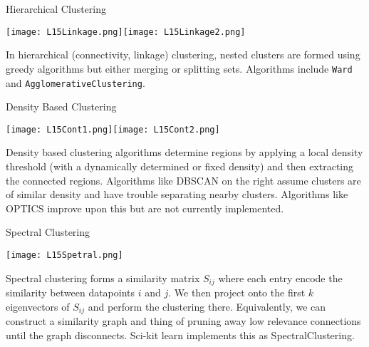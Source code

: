 \documentclass[10pt, table, dvipsnames,xcdraw,handout]{beamer}
\begin{document}
\begin{frame}[fragile]{Hierarchical Clustering}
  \begin{minipage}[t][0.5\textheight][t]{\textwidth}
	\centering \texttt{[image: L15Linkage.png]}\hspace{3em}\texttt{[image: L15Linkage2.png]} 
  \end{minipage}
  \vfill
\begin{minipage}[t][0.4\textheight][t]{\textwidth}
In hierarchical (connectivity, linkage) clustering, nested clusters are formed using greedy algorithms but either merging or splitting sets. \pause Algorithms include \texttt{Ward} and \texttt{AgglomerativeClustering}. 
\end{minipage}
\end{frame}


\begin{frame}[fragile]{Density Based Clustering}
  \begin{minipage}[t][0.5\textheight][t]{\textwidth}
	\centering \texttt{[image: L15Cont1.png]}\hspace{1em}\texttt{[image: L15Cont2.png]} 
  \end{minipage}
  \vfill
\begin{minipage}[t][0.5\textheight][t]{\textwidth}
Density based clustering algorithms determine regions by applying a local density threshold (with a dynamically determined or fixed density) and then extracting the connected regions. \pause Algorithms like DBSCAN on the right assume clusters are of similar density and have trouble separating nearby clusters. Algorithms like OPTICS improve upon this but are not currently implemented. 
\end{minipage}
\end{frame}


\begin{frame}[fragile]{Spectral Clustering}
  \begin{minipage}[t][0.5\textheight][t]{\textwidth}
	\centering \texttt{[image: L15Spetral.png]}
  \end{minipage}
  \vfill
\begin{minipage}[t][0.5\textheight][t]{\textwidth}
Spectral clustering forms a similarity matrix $S_{ij}$ where each entry encode the similarity between datapoints $i$ and $j$. We then project onto the first $k$ eigenvectors of $S_{ij}$ and perform the clustering there. \pause Equivalently, we can construct a similarity graph and thing of pruning away low relevance connections until the graph disconnects. Sci-kit learn implements this as SpectralClustering.
\end{minipage}
\end{frame}
\end{document}
